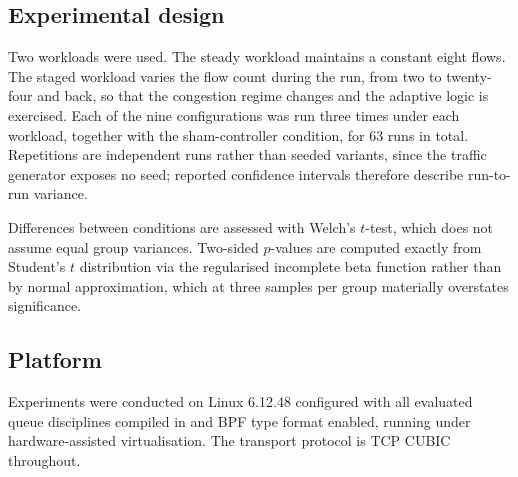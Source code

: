 \subsection*{Experimental design}

Two workloads were used. The steady workload maintains a constant eight flows.
The staged workload varies the flow count during the run, from two to
twenty-four and back, so that the congestion regime changes and the adaptive
logic is exercised. Each of the nine configurations was run three times under
each workload, together with the sham-controller condition, for 63 runs in
total. Repetitions are independent runs rather than seeded variants, since the
traffic generator exposes no seed; reported confidence intervals therefore
describe run-to-run variance.

Differences between conditions are assessed with Welch's $t$-test, which does
not assume equal group variances. Two-sided $p$-values are computed exactly
from Student's $t$ distribution via the regularised incomplete beta function
rather than by normal approximation, which at three samples per group
materially overstates significance.

\subsection*{Platform}

Experiments were conducted on Linux 6.12.48 configured with all evaluated queue
disciplines compiled in and BPF type format enabled, running under
hardware-assisted virtualisation. The transport protocol is TCP
CUBIC\cite{cubic2008} throughout.
